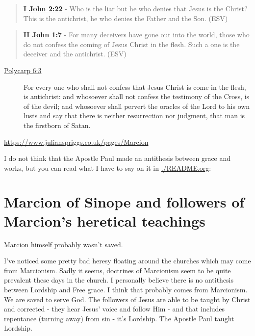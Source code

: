 \documentclass[11pt]{article}
\begin{document}
\begin{quote}
\textbf{\href{https://www.biblegateway.com/passage/?search=1\%20John\%202\%3A22\&version=ESV}{I John 2:22}} - Who is the liar but he who denies that Jesus is the Christ? This is the antichrist, he who denies the Father and the Son. (ESV)
\end{quote}

\begin{quote}
\textbf{\href{https://www.biblegateway.com/passage/?search=2\%20John\%201\%3A7\&version=ESV}{II John 1:7}} - For many deceivers have gone out into the world, those who do not confess the coming of Jesus Christ in the flesh. Such a one is the deceiver and the antichrist. (ESV)
\end{quote}

\begin{description}
\item[{\href{https://www.earlychristianwritings.com/text/polycarp-lightfoot.html}{Polycarp 6:3}}] For every one who shall not confess that Jesus Christ is come in the flesh, is antichrist: and whosoever shall not confess the testimony of the Cross, is of the devil; and whosoever shall pervert the oracles of the Lord to his own lusts and say that there is neither resurrection nor judgment, that man is the firstborn of Satan.
\end{description}

\url{https://www.julianspriggs.co.uk/pages/Marcion}

I do not think that the Apostle Paul made an antithesis between grace and works, but you can read what I have to say on it in \url{./README.org}:

\section{Marcion of Sinope and followers of Marcion's heretical teachings}
\label{sec:org161f75b}
Marcion himself probably wasn't saved.

I've noticed some pretty bad heresy floating around the churches which may come from Marcionism.
Sadly it seems, doctrines of Marcionism seem to be quite prevalent these days in
the church. I personally believe there is no antithesis between Lordship and Free grace. I think that probably comes from Marcionism.
We are saved to serve God. The followers of Jesus are able to be taught by Christ and corrected - they hear Jesus' voice and follow Him - and that includes repentance (turning away) from sin - it's Lordship. The Apostle Paul taught Lordship.
\end{document}
